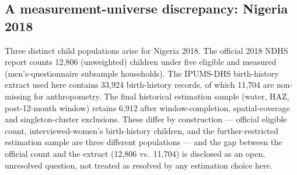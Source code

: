 \subsection{A measurement-universe discrepancy: Nigeria 2018}\label{sec:3.9}

Three distinct child populations arise for Nigeria 2018. The official 2018 NDHS report counts 12,806 (unweighted) children under five eligible and measured (men's-questionnaire subsample households). The IPUMS-DHS birth-history extract used here contains 33,924 birth-history records, of which 11,704 are non-missing for anthropometry. The final historical estimation sample (water, HAZ, post-12-month window) retains 6,912 after window-completion, spatial-coverage and singleton-cluster exclusions. These differ by construction --- official eligible count, interviewed-women's birth-history children, and the further-restricted estimation sample are three different populations --- and the gap between the official count and the extract (12,806 vs.~11,704) is disclosed as an open, unresolved question, not treated as resolved by any estimation choice here.

